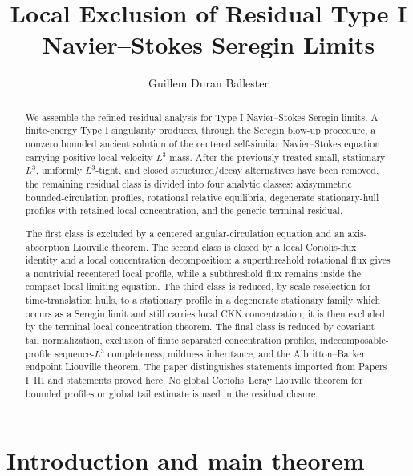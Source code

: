 \documentclass[11pt]{amsart}
\title[Residual Type I Seregin limit exclusion]
{Local Exclusion of Residual Type I Navier--Stokes Seregin Limits}
\author{Guillem Duran Ballester}
\date{}
\numberwithin{equation}{section}
\theoremstyle{plain}
\theoremstyle{definition}
\theoremstyle{remark}
\begin{document}
\begin{abstract}
We assemble the refined residual analysis for Type I
Navier--Stokes Seregin limits.  A finite-energy Type I singularity produces,
through the Seregin blow-up procedure, a nonzero bounded ancient solution of
the centered self-similar Navier--Stokes equation carrying positive local
velocity \(L^3\)-mass.  After the
previously treated small, stationary \(L^3\), uniformly \(L^3\)-tight, and
closed structured/decay alternatives have been removed, the remaining
residual class is divided into four analytic classes: axisymmetric
bounded-circulation profiles, rotational relative equilibria, degenerate
stationary-hull profiles with retained local concentration, and the generic
terminal residual.

The first class is excluded by a centered angular-circulation equation and an
axis-absorption Liouville theorem.  The second class is closed by a local
Coriolis-flux identity and a local concentration decomposition: a superthreshold
rotational flux gives a nontrivial recentered local profile, while a subthreshold flux
remains inside the compact local limiting equation.  The third class is
reduced, by scale reselection for time-translation hulls, to a stationary
profile in a degenerate stationary family which occurs as a Seregin limit
and still carries local CKN concentration; it is then excluded by the terminal
local concentration theorem.  The final class is
reduced by covariant tail normalization, exclusion of finite separated
concentration profiles, indecomposable-profile sequence-\(L^3\) completeness,
mildness inheritance, and the Albritton--Barker endpoint Liouville theorem.  The paper
distinguishes statements imported from Papers I--III and statements proved
here.  No global Coriolis--Leray Liouville theorem for bounded profiles or global
tail estimate is used in the residual closure.
\end{abstract}

\maketitle
\tableofcontents

\section{Introduction and main theorem}
\label{sec:introduction}
\end{document}
